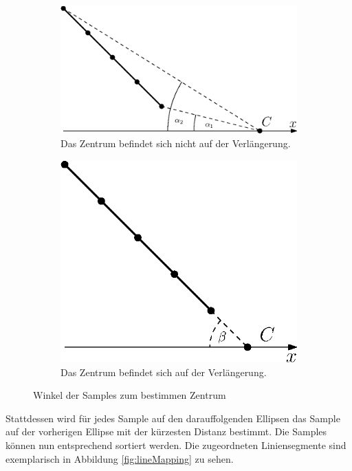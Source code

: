 \begin{figure}[!htb]
	\centering
	\begin{subfigure}[t]{.6\textwidth}
		\centering
		\includegraphics[width=.9\textwidth]{images/sampleMappingProblem.eps}
		\caption{Das Zentrum befindet sich nicht auf der Verlängerung.}
		\label{fig:sampleMappingProblem1}
	\end{subfigure}%
	\begin{subfigure}[t]{.4\textwidth}
		\centering
		\includegraphics[width=.9\textwidth]{images/sampleMappingProblem2.eps}
		\caption{Das Zentrum befindet sich auf der Verlängerung.}
		\label{fig:sampleMappingProblem2}
	\end{subfigure}
	\caption{Winkel der Samples zum bestimmen Zentrum}
	\label{fig:sampleMappingProblem}
\end{figure}

Stattdessen wird für jedes Sample auf den darauffolgenden Ellipsen das Sample auf der vorherigen Ellipse mit der kürzesten Distanz bestimmt.
Die Samples können nun entsprechend sortiert werden. Die zugeordneten Liniensegmente sind exemplarisch in Abbildung \ref{fig:lineMapping} zu sehen. 



